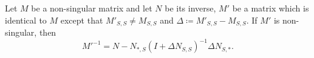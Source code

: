 \begin{corollary}
    \label{cor:1}
    Let \(M\) be a non-singular matrix and let \(N\) be its inverse, 
    \(M'\) be a matrix which is identical to \(M\) except that \(M'_{S, S} \neq M_{S, S}\)
    and \(\Delta \coloneqq M'_{S, S} - M_{S, S}\).
    If \(M'\) is non-singular, then
    \[
        M'^{-1} = N - N_{*, S}(I + \Delta N_{S, S})^{-1}\Delta N_{S, *}.
    \]
\end{corollary}